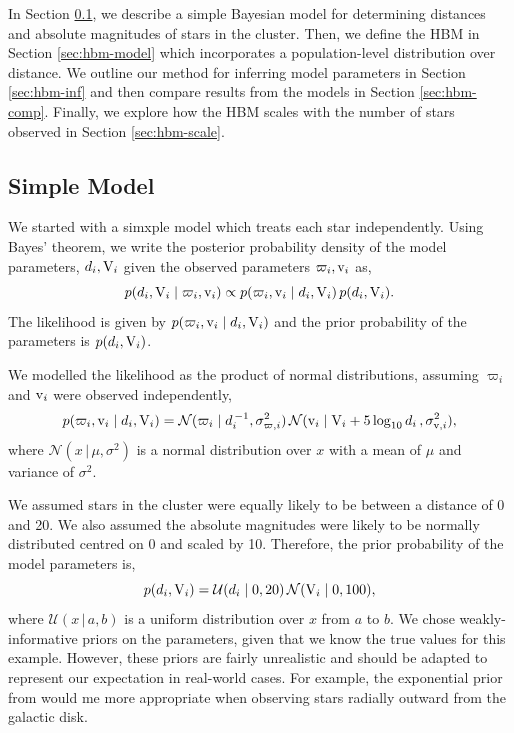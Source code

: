 In Section \ref{sec:simple-model}, we describe a simple Bayesian model for determining distances and absolute magnitudes of stars in the cluster. Then, we define the HBM in Section \ref{sec:hbm-model} which incorporates a population-level distribution over distance. We outline our method for inferring model parameters in Section \ref{sec:hbm-inf} and then compare results from the models in Section \ref{sec:hbm-comp}. Finally, we explore how the HBM scales with the number of stars observed in Section \ref{sec:hbm-scale}.

\subsection{Simple Model}\label{sec:simple-model}

We started with a simxple model which treats each star independently. Using Bayes' theorem, we write the posterior probability density of the model parameters, \(d_i, \mathrm{V}_i\) given the observed parameters \(\varpi_i, \mathrm{v}_i\) as,
%
\begin{equation}
    p(d_i, \mathrm{V}_i \mid \varpi_i, \mathrm{v}_i) \propto p(\varpi_i, \mathrm{v}_i \mid d_i, \mathrm{V}_i) \, p(d_i, \mathrm{V}_i).
\end{equation}
%
The likelihood is given by \(p(\varpi_i, \mathrm{v}_i \mid d_i, \mathrm{V}_i)\) and the prior probability of the parameters is \(p(d_i, \mathrm{V}_i)\).

We modelled the likelihood as the product of normal distributions, assuming \(\varpi_i\) and \(\mathrm{v}_i\) were observed independently,
%
\begin{equation}
    p(\varpi_i, \mathrm{v}_i \mid d_i, \mathrm{V}_i) = \mathcal{N}(\varpi_i \mid d_i^{\,-1}, \sigma_{\varpi, i}^2) \, \mathcal{N}(\mathrm{v}_i \mid \mathrm{V}_i + 5\log_{10}d_i \, , \sigma_{\mathrm{v}, i}^2),\label{eq:hbm-like}
\end{equation}
%
where \(\mathcal{N}(x \,|\, \mu, \sigma^2)\) is a normal distribution over \(x\) with a mean of \(\mu\) and variance of \(\sigma^2\).

We assumed stars in the cluster were equally likely to be between a distance of 0 and 20. We also assumed the absolute magnitudes were likely to be normally distributed centred on 0 and scaled by 10. Therefore, the prior probability of the model parameters is,
%
\begin{equation}
    p(d_i, \mathrm{V}_i) = \mathcal{U}(d_i \mid 0, 20) \, \mathcal{N}(\mathrm{V}_i \mid 0, 100),
\end{equation}
%
where \(\mathcal{U}(x \,|\, a, b)\) is a uniform distribution over \(x\) from \(a\) to \(b\). We chose weakly-informative priors on the parameters, given that we know the true values for this example. However, these priors are fairly unrealistic and should be adapted to represent our expectation in real-world cases. For example, the exponential prior from \citet{Bailer-Jones.Rybizki.ea2018} would me more appropriate when observing stars radially outward from the galactic disk.

